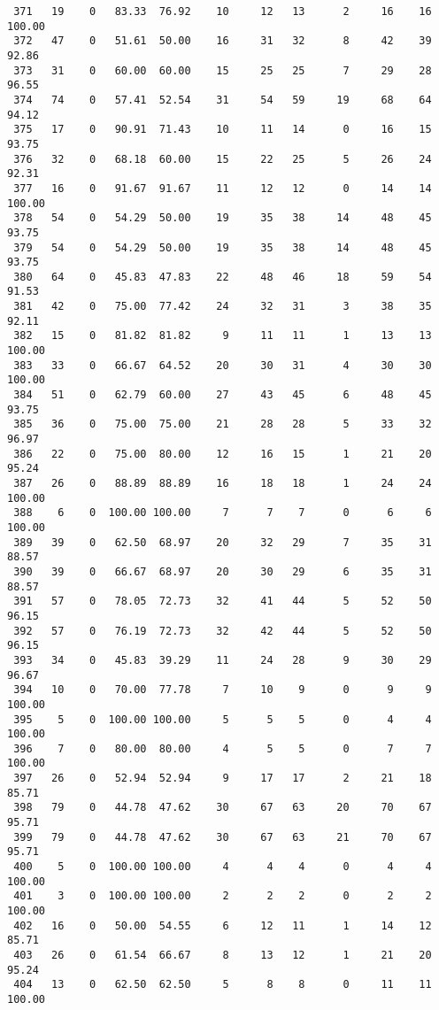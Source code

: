 \begin{verbatim}
 371   19    0   83.33  76.92    10     12   13      2     16    16   100.00
 372   47    0   51.61  50.00    16     31   32      8     42    39    92.86
 373   31    0   60.00  60.00    15     25   25      7     29    28    96.55
 374   74    0   57.41  52.54    31     54   59     19     68    64    94.12
 375   17    0   90.91  71.43    10     11   14      0     16    15    93.75
 376   32    0   68.18  60.00    15     22   25      5     26    24    92.31
 377   16    0   91.67  91.67    11     12   12      0     14    14   100.00
 378   54    0   54.29  50.00    19     35   38     14     48    45    93.75
 379   54    0   54.29  50.00    19     35   38     14     48    45    93.75
 380   64    0   45.83  47.83    22     48   46     18     59    54    91.53
 381   42    0   75.00  77.42    24     32   31      3     38    35    92.11
 382   15    0   81.82  81.82     9     11   11      1     13    13   100.00
 383   33    0   66.67  64.52    20     30   31      4     30    30   100.00
 384   51    0   62.79  60.00    27     43   45      6     48    45    93.75
 385   36    0   75.00  75.00    21     28   28      5     33    32    96.97
 386   22    0   75.00  80.00    12     16   15      1     21    20    95.24
 387   26    0   88.89  88.89    16     18   18      1     24    24   100.00
 388    6    0  100.00 100.00     7      7    7      0      6     6   100.00
 389   39    0   62.50  68.97    20     32   29      7     35    31    88.57
 390   39    0   66.67  68.97    20     30   29      6     35    31    88.57
 391   57    0   78.05  72.73    32     41   44      5     52    50    96.15
 392   57    0   76.19  72.73    32     42   44      5     52    50    96.15
 393   34    0   45.83  39.29    11     24   28      9     30    29    96.67
 394   10    0   70.00  77.78     7     10    9      0      9     9   100.00
 395    5    0  100.00 100.00     5      5    5      0      4     4   100.00
 396    7    0   80.00  80.00     4      5    5      0      7     7   100.00
 397   26    0   52.94  52.94     9     17   17      2     21    18    85.71
 398   79    0   44.78  47.62    30     67   63     20     70    67    95.71
 399   79    0   44.78  47.62    30     67   63     21     70    67    95.71
 400    5    0  100.00 100.00     4      4    4      0      4     4   100.00
 401    3    0  100.00 100.00     2      2    2      0      2     2   100.00
 402   16    0   50.00  54.55     6     12   11      1     14    12    85.71
 403   26    0   61.54  66.67     8     13   12      1     21    20    95.24
 404   13    0   62.50  62.50     5      8    8      0     11    11   100.00

\end{verbatim}

